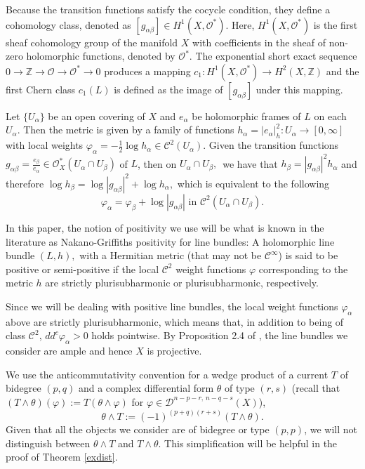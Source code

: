 \documentclass[11pt,leqno,oneside]{amsart}
\numberwithin{equation}{section}
\begin{document}
Because the transition functions satisfy the cocycle condition, they define a cohomology class, denoted as
\([g_{\alpha \beta}] \in H^{1}(X, \mathcal{O}^{*})\). Here, \(H^{1}(X, \mathcal{O}^{*})\) is the first sheaf
cohomology group of the manifold \(X\) with coefficients in the sheaf of non-zero holomorphic functions,
denoted by \(\mathcal{O}^{*}\). The exponential short exact sequence \(0 \rightarrow \mathbb{Z} \rightarrow \mathcal{O}
\rightarrow \mathcal{O}^{*} \rightarrow 0\) produces a mapping \(c_{1}: H^{1}(X, \mathcal{O}^*) \rightarrow H^{2}(X, \mathbb{Z})\) and the first Chern class
\(c_{1}(L)\) is defined as the image of \([g_{\alpha \beta}]\) under this mapping.




Let $\{U_{\alpha}\}$ be an open covering of $X$ and $e_{\alpha}$ be  holomorphic frames of $L$ on each $U_{\alpha}$. Then the metric is given by a family of functions $h_{\alpha}=|e_{\alpha}|^{2}_{h}:U_{\alpha}\rightarrow [0, \infty]$ with local weights $\varphi_{\alpha}=-\frac{1}{2}\log{h_{\alpha}}\in \mathscr{C}^{2}(U_{\alpha})$. Given the transition functions $g_{\alpha\beta}=\frac{e_{\beta}}{e_{\alpha}}\in \mathcal{O}^{*}_{X}(U_{\alpha}\cap U_{\beta})$ of $L$, then on $U_{\alpha}\cap U_{\beta},$\, we have that $h_{\beta}=|g_{\alpha\beta}|^{2}h_{\alpha}$ and therefore $\log{h_{\beta}}=\log{|g_{\alpha\beta}|^{2}}+ \log{h_{\alpha}},$ which is equivalent to the following  $$\varphi_{\alpha}=\varphi_{\beta}+ \log{|g_{\alpha\beta}|}\,\, \text{in}\,\,\mathscr{C}^{2}(U_{\alpha}\cap U_{\beta}).$$

In this paper, the notion of positivity we use will be what is known in the literature as Nakano-Griffiths positivity for line bundles: A holomorphic line bundle $(L, h),$ with a Hermitian metric (that may not be $\mathscr{C}^{\infty}$)  is said to be positive or semi-positive if the local $\mathscr{C}^{2}$ weight functions $\varphi$ corresponding to the metric $h$ are strictly plurisubharmonic or plurisubharmonic, respectively.


Since we will be dealing with positive line bundles, the local weight functions $\varphi_{\alpha}$ above are strictly plurisubharmonic, which means that, in addition to being of class $\mathscr{C}^{2}$, $dd^{c} \varphi_{\alpha} >0$ holds pointwise. By Proposition 2.4 of \cite{CMM}, the line bundles we consider are ample and hence $X$ is projective.

We use the anticommutativity convention for a wedge product of a current $T$ of bidegree $(p, q)$ and a complex differential form $\theta$ of type $(r, s)$ (recall that $(T \wedge \theta)(\varphi):= T(\theta \wedge\varphi)$ for $\varphi \in \mathcal{D}^{n-p-r, \,n-q-s}(X)$), \begin{equation} \label{antc}\theta \wedge T:= (-1)^{(p+q)(r+s)} (T \wedge \theta).\end{equation} Given that all the objects we consider are of bidegree or type $(p, p)$, we will not distinguish between $\theta \wedge T$ and $T \wedge \theta$. This simplification will be helpful in the proof of Theorem \ref{exdist}.
\end{document}
